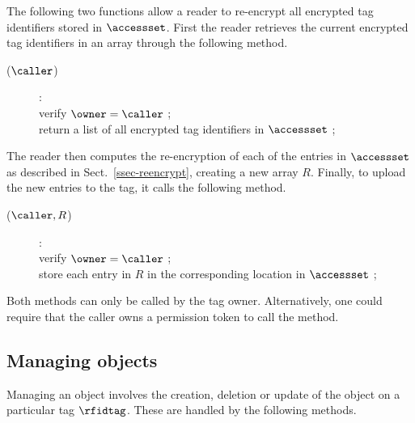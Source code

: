 The following two functions allow a reader to re-encrypt all encrypted tag
identifiers stored in $\accessset$. First the reader retrieves the current
encrypted tag identifiers in an array through the following method.
\begin{description}
\item[($\caller$)]:\\
	verify $\owner = \caller$ ; \\
	return a list of all encrypted tag identifiers in $\accessset$ ; 
\end{description}
The reader then computes the re-encryption of each of the entries in
$\accessset$ as described in Sect.~\ref{ssec-reencrypt}, creating a new array
$R$. Finally, to upload the new entries to the tag, it calls the following
method. 
\begin{description}
\item[($\caller,R$)]: \\
	verify $\owner = \caller$ ; \\
	store each entry in $R$ in the corresponding location in $\accessset$ ;
\end{description}
Both methods can only be called by the tag owner.
Alternatively, one could require that the caller owns a permission token to
call the method. 

\subsection{Managing objects}
\label{ssec-manage}

Managing an object involves the creation, deletion or update of the object on a
particular tag $\rfidtag$. These are handled by the following methods.

